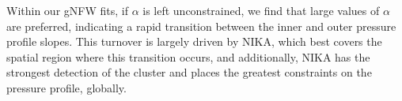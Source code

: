 \documentclass[twocolumn,traditabstract]{aa}
\begin{document}




Within our gNFW fits, if $\alpha$ is left unconstrained, we find that large values of $\alpha$ are preferred,
indicating a rapid transition between the inner and outer pressure profile slopes. This turnover is largely
driven by NIKA, which best covers the spatial region where this transition occurs, and additionally, NIKA
has the strongest detection of the cluster and places the greatest constraints on the pressure profile, globally.

\end{document}
